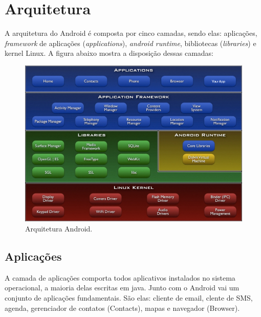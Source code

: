 \section{Arquitetura}
  A arquitetura do Android é composta por cinco camadas, sendo elas: aplicações, 
  \textit{framework} de aplicações (\textit{applications}), \textit{android runtime}, bibliotecas (\textit{libraries}) e kernel Linux.
  A figura abaixo mostra a disposição dessas camadas:
\begin{figure}[hb]
\centering
\includegraphics[scale=0.45]{images/Android-architecture.jpg}
\caption{Arquitetura Android\cite{android1}. }
\label{fig:android-arc}
\end{figure}
	
	
\subsection{Aplicações}
 A camada de aplicações comporta todos aplicativos instalados no sistema operacional, a maioria delas escritas em java.
Junto com o Android vai um conjunto de aplicações fundamentais. São elas: cliente de email, clente de SMS, agenda, gerenciador de contatos (Contacts),
mapas e navegador (Browser).

